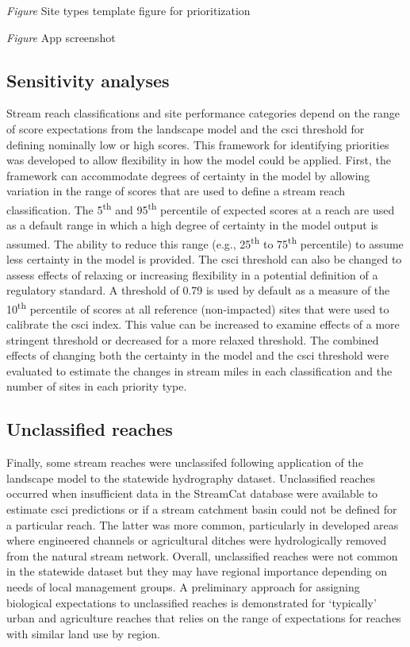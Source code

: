 \documentclass[]{article}
\begin{document}
\emph{Figure} Site types template figure for prioritization

\emph{Figure} App screenshot

\subsection{Sensitivity analyses}\label{sensitivity-analyses}

Stream reach classifications and site performance categories depend on
the range of score expectations from the landscape model and the
\ac{csci} threshold for defining nominally low or high scores. This
framework for identifying priorities was developed to allow flexibility
in how the model could be applied. First, the framework can accommodate
degrees of certainty in the model by allowing variation in the range of
scores that are used to define a stream reach classification. The
5\textsuperscript{th} and 95\textsuperscript{th} percentile of expected
scores at a reach are used as a default range in which a high degree of
certainty in the model output is assumed. The ability to reduce this
range (e.g., 25\textsuperscript{th} to 75\textsuperscript{th}
percentile) to assume less certainty in the model is provided. The
\ac{csci} threshold can also be changed to assess effects of relaxing or
increasing flexibility in a potential definition of a regulatory
standard. A threshold of 0.79 is used by default as a measure of the
10\textsuperscript{th} percentile of scores at all reference
(non-impacted) sites that were used to calibrate the \ac{csci} index.
This value can be increased to examine effects of a more stringent
threshold or decreased for a more relaxed threshold. The combined
effects of changing both the certainty in the model and the \ac{csci}
threshold were evaluated to estimate the changes in stream miles in each
classification and the number of sites in each priority type.

\subsection{Unclassified reaches}\label{unclassified-reaches}

Finally, some stream reaches were unclassifed following application of
the landscape model to the statewide hydrography dataset. Unclassified
reaches occurred when insufficient data in the StreamCat database were
available to estimate \ac{csci} predictions or if a stream catchment
basin could not be defined for a particular reach. The latter was more
common, particularly in developed areas where engineered channels or
agricultural ditches were hydrologically removed from the natural stream
network. Overall, unclassified reaches were not common in the statewide
dataset but they may have regional importance depending on needs of
local management groups. A preliminary approach for assigning biological
expectations to unclassified reaches is demonstrated for `typically'
urban and agriculture reaches that relies on the range of expectations
for reaches with similar land use by region.
\end{document}
